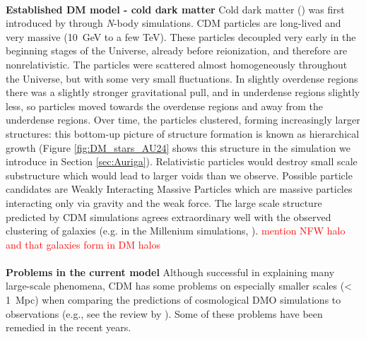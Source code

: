 \\\textbf{Established \ac{DM} model - cold dark matter}
Cold dark matter () was first introduced by \cite{Davis....CDM...1985} through \textit{N}-body simulations. \ac{CDM} particles are long-lived and very massive (\SI{10}{GeV} to a few TeV). These particles decoupled very early in the beginning stages of the Universe, already before reionization, and therefore are nonrelativistic. The particles were scattered almost homogeneously throughout the Universe, but with some very small fluctuations. In slightly overdense regions there was a slightly stronger gravitational pull, and in underdense regions slightly less, so particles moved towards the overdense regions and away from the underdense regions. Over time, the particles clustered, forming increasingly larger structures: this bottom-up picture of structure formation is known as hierarchical growth (Figure \ref{fig:DM_stars_AU24} shows this structure in the simulation we introduce in Section \ref{sec:Auriga}). Relativistic particles would destroy small scale substructure which would lead to larger voids than we observe. Possible particle candidates are Weakly Interacting Massive Particles which are massive particles interacting only via gravity and the weak force. The large scale structure predicted by \ac{CDM} simulations agrees extraordinary well with the observed clustering of galaxies (e.g. in the Millenium simulations, \citealp{Springel...Millenium...2005}).  \textcolor{red}{mention NFW halo and that galaxies form in DM halos}\\
\\\textbf{Problems in the current model}
Although successful in explaining many large-scale phenomena, \ac{CDM} has some problems on especially smaller scales (< \SI{1}{Mpc}) when comparing the predictions of cosmological \ac{DMO} simulations to observations (e.g., see the review by \citealp{Bullock...LCDMprobs...2017}). Some of these problems have been remedied in the recent years.

